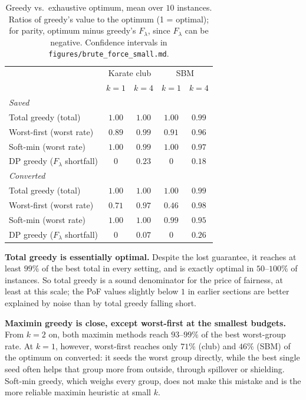 \begin{table}[H]
\centering
\footnotesize
\setlength{\tabcolsep}{2.5pt}
\begin{tabular}{lcccc}
\hline
& \multicolumn{2}{c}{Karate club} & \multicolumn{2}{c}{SBM} \\
& $k=1$ & $k=4$ & $k=1$ & $k=4$ \\
\hline
\multicolumn{5}{l}{\emph{Saved}} \\
Total greedy (total) & $1.00$ & $1.00$ & $1.00$ & $0.99$ \\
Worst-first (worst rate) & $0.89$ & $0.99$ & $0.91$ & $0.96$ \\
Soft-min (worst rate) & $1.00$ & $0.99$ & $1.00$ & $0.97$ \\
DP greedy ($F_\lambda$ shortfall) & $0$ & $0.23$ & $0$ & $0.18$ \\
\hline
\multicolumn{5}{l}{\emph{Converted}} \\
Total greedy (total) & $1.00$ & $1.00$ & $1.00$ & $0.99$ \\
Worst-first (worst rate) & $0.71$ & $0.97$ & $0.46$ & $0.98$ \\
Soft-min (worst rate) & $1.00$ & $1.00$ & $0.99$ & $0.95$ \\
DP greedy ($F_\lambda$ shortfall) & $0$ & $0.07$ & $0$ & $0.26$ \\
\hline
\end{tabular}
\caption{Greedy vs.\ exhaustive optimum, mean over $10$ instances. Ratios of greedy's value to the optimum (1 = optimal); for parity, optimum minus greedy's $F_\lambda$, since $F_\lambda$ can be negative. Confidence intervals in \texttt{figures/brute\_force\_small.md}.}
\label{tab:brute}
\end{table}

\textbf{Total greedy is essentially optimal.} Despite the lost guarantee, it reaches at least $99\%$ of the best total in every setting, and is exactly optimal in $50$--$100\%$ of instances. So total greedy is a sound denominator for the price of fairness, at least at this scale; the PoF values slightly below $1$ in earlier sections are better explained by noise than by total greedy falling short.

\textbf{Maximin greedy is close, except worst-first at the smallest budgets.} From $k=2$ on, both maximin methods reach $93$--$99\%$ of the best worst-group rate. At $k=1$, however, worst-first reaches only $71\%$ (club) and $46\%$ (SBM) of the optimum on converted: it seeds the worst group directly, while the best single seed often helps that group more from outside, through spillover or shielding. Soft-min greedy, which weighs every group, does not make this mistake and is the more reliable maximin heuristic at small $k$.

